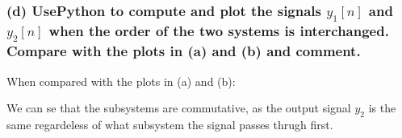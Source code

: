 \subsubsection*{(d) UsePython to compute and plot the signals $y_1[n]$ and $y_2[n]$ when the order of the two systems is interchanged. Compare with the plots in (a) and (b) and comment.}



When compared with the plots in (a) and (b):



We can se that the subsystems are commutative, as the output signal $y_2$ is the same regardeless of what subsystem the signal passes thrugh first. 


